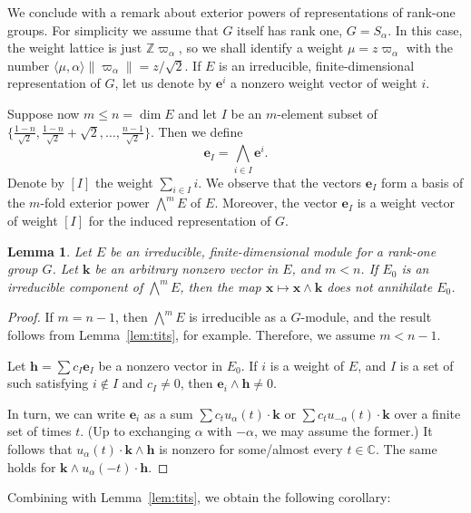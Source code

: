 \documentclass{amsart}
\theoremstyle{plain}
\newtheorem{lemma}[theorem]{Lemma}
\theoremstyle{definition}
\theoremstyle{remark}
\newcommand{\Vect}[1]{\mathbold{#1}}
\providecommand{\norm}[1]{\lVert#1\rVert}
\begin{document}
We conclude with a remark about exterior powers of representations of rank-one groups.
For simplicity we assume that $G$ itself has rank one, $G = S_{\alpha}$. In this case,
the weight lattice is just $\mathbb{Z}\varpi_{\alpha}$, so we shall identify
a weight $\mu = z\varpi_{\alpha}$ with the number $\langle \mu, \alpha \rangle
\norm{\varpi_{\alpha}} =
z / \sqrt{2}$. If $E$ is an irreducible, finite-dimensional representation of $G$, let us
denote by $\Vect{e}^{i}$ a nonzero weight vector of weight $i$.

Suppose now $m \leqslant n = \dim E$ and let $I$ be an $m$-element subset of
$\{\frac{1-n}{\sqrt{2}},
\frac{1-n}{\sqrt{2}} + \sqrt{2}, \ldots, \frac{n - 1}{\sqrt{2}}\}$. Then we define
$$\Vect{e}_{I} = \bigwedge_{i \in I}\Vect{e}^{i}.$$
Denote
by $[I]$ the weight $\sum_{i \in I} i$. We observe that the vectors
$\Vect{e}_{I}$ form a basis of the $m$-fold exterior power $\textstyle{\bigwedge^{\!m}} E$ of
$E$. Moreover, the vector $\Vect{e}_{I}$ is a weight vector of weight $[I]$ for the induced representation of $G$.
\begin{lemma}\label{lem:rank1exteriorpower}
Let $E$ be an irreducible, finite-dimensional module for a rank-one group $G$. Let $\Vect{k}$
be an arbitrary nonzero vector in $E$, and $m < n$. If $E_{0}$ is an
irreducible component of $\textstyle{\bigwedge^{\!m}} E$, then the map $\Vect{x} \mapsto
\Vect{x} \wedge \Vect{k}$ does not annihilate $E_{0}$.
\end{lemma}
\begin{proof}
If $m = n - 1$, then $\textstyle{\bigwedge^{\!m}} E$ is irreducible as a $G$-module, and
the result follows from Lemma~\ref{lem:tits}, for example. Therefore, we assume $m < n
-1$.

Let $\Vect{h} = \sum c_{I} \Vect{e}_{I}$ be a nonzero vector in $E_{0}$.
If $i$ is a weight of $E$, and $I$ is a set of such satisfying $i \notin I$ and $c_{I}
\neq 0$, then $\Vect{e}_{i} \wedge \Vect{h} \neq 0$.

In turn, we can write $\Vect{e}_{i}$ as a sum $\sum c_{t}u_{\alpha}(t) \cdot
\Vect{k}$ or $\sum c_{t}u_{-\alpha}(t) \cdot
\Vect{k}$ over a finite set of times $t$. (Up to exchanging $\alpha$ with $-\alpha$, we
may assume the former.) It follows
that $u_{\alpha}(t) \cdot \Vect{k} \wedge \Vect{h}$ is nonzero for some/almost every $t
\in \mathbb{C}$. The same holds for $\Vect{k} \wedge u_{\alpha}(-t) \cdot \Vect{h}$.
\end{proof}

Combining with Lemma~\ref{lem:tits}, we obtain the following corollary:
\end{document}
